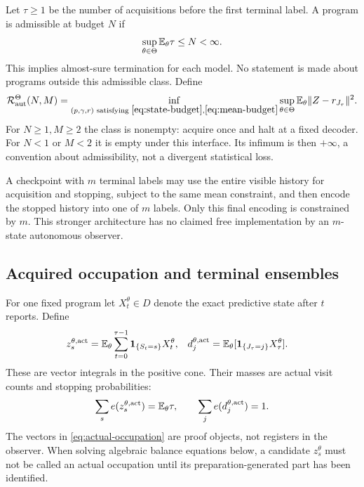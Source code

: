 Let $\tau\ge1$ be the number of acquisitions before the first terminal label. A program is admissible at budget $N$ if
\begin{equation}\label{eq:mean-budget}
 \sup_{\theta\in\Theta}\mathbb E_\theta\tau\le N<\infty.
\end{equation}
This implies almost-sure termination for each model. No statement is made about programs outside this admissible class. Define
\[
 \mathcal R_{\mathrm{aut}}^\Theta(N,M)
 =\inf_{(p,\gamma,r)\text{ satisfying }\eqref{eq:state-budget},\eqref{eq:mean-budget}}
      \sup_{\theta\in\Theta}\mathbb E_\theta\lVert Z-r_{J_\tau}\rVert^2.
\]
For $N\ge1,M\ge2$ the class is nonempty: acquire once and halt at a fixed decoder. For $N<1$ or $M<2$ it is empty under this interface. Its infimum is then $+\infty$, a convention about admissibility, not a divergent statistical loss.

A checkpoint with $m$ terminal labels may use the entire visible history for acquisition and stopping, subject to the same mean constraint, and then encode the stopped history into one of $m$ labels. Only this final encoding is constrained by $m$. This stronger architecture has no claimed free implementation by an $m$-state autonomous observer.

\subsection{Acquired occupation and terminal ensembles}
For one fixed program let $X_t^\theta\in D$ denote the exact predictive state after $t$ reports. Define
\begin{align}
 z_s^{\theta,\mathrm{act}}
  &=\mathbb E_\theta\sum_{t=0}^{\tau-1}\mathbf 1_{\{S_t=s\}}X_t^\theta,
 &d_j^{\theta,\mathrm{act}}
  &=\mathbb E_\theta[\mathbf 1_{\{J_\tau=j\}}X_\tau^\theta].\label{eq:actual-occupation}
\end{align}
These are vector integrals in the positive cone. Their masses are actual visit counts and stopping probabilities:
\[
 \sum_s e(z_s^{\theta,\mathrm{act}})=\mathbb E_\theta\tau,\qquad
 \sum_j e(d_j^{\theta,\mathrm{act}})=1.
\]
The vectors in \eqref{eq:actual-occupation} are proof objects, not registers in the observer. When solving algebraic balance equations below, a candidate $z_s^\theta$ must not be called an actual occupation until its preparation-generated part has been identified.

